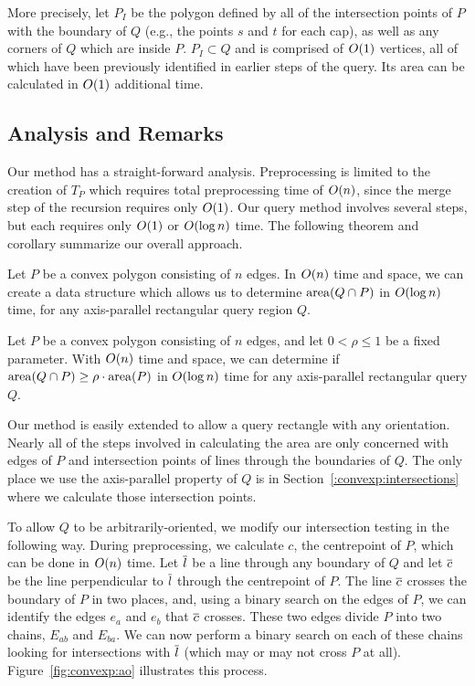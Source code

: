 More precisely, let $P_I$ be the polygon defined by all of the intersection  points of $P$ with the boundary of $Q$ (e.g., the points $s$ and $t$ for each cap), as well as any corners of $Q$ which are inside $P$. $P_I \subset Q$ and is comprised of $O\!\left(1\right)$ vertices, all of which have been previously identified in earlier steps of the query. Its area can be calculated in $O\!\left(1\right)$ additional time.


\subsection{Analysis and Remarks}
\label{:convexp:analysis}

Our method has a straight-forward analysis. 
Preprocessing is limited to the creation of $T_P$ which requires total preprocessing time of $O\!\left(n\right)$, since the merge step of the recursion requires only $O\!\left(1\right)$.
Our query method involves several steps, but each requires only $O\!\left(1\right)$ or $O\!\left(\log{n}\right)$ time. 
The following theorem and corollary summarize our overall approach.

\begin{theorem}
\label{th:convexp:area}
Let $P$ be a convex polygon consisting of $n$ edges. In $O\!\left(n\right)$ time and space, we can create a data structure which allows us to determine $\operatorname{area}\!\left(Q \cap P\right)$ in $O\!\left(\log{n}\right)$ time, for any axis-parallel rectangular query region $Q$.
\end{theorem}

\begin{corollary}
\label{cor:convexp:mp}
Let $P$ be a convex polygon consisting of $n$ edges, and let $0 < \rho \leq 1$ be a fixed parameter. With $O\!\left(n\right)$ time and space, we can determine if $\operatorname{area}\!\left(Q \cap P\right) \geq \rho \cdot \operatorname{area}\!\left(P\right)$ in $O\!\left(\log{n}\right)$ time for any axis-parallel rectangular query $Q$.
\end{corollary}

Our method is easily extended to allow a query rectangle with any orientation.
Nearly all of the steps involved in calculating the area are only concerned with edges of $P$ and intersection points of lines through the boundaries of $Q$.
The only place we use the axis-parallel property of $Q$ is in Section~\ref{:convexp:intersections} where we calculate those intersection points.

To allow $Q$ to be arbitrarily-oriented, we modify our intersection testing in the following way. 
During preprocessing, we calculate $c$, the centrepoint of $P$, which can be done in $O\!\left(n\right)$ time.
Let $\overline{l}$ be a line through any boundary of $Q$ and let $\overline{c}$ be the line perpendicular to $\overline{l}$ through the centrepoint of $P$.
The line $\overline{c}$ crosses the boundary of $P$ in two places, and, using a binary search on the edges of $P$, we can identify the edges $e_a$ and $e_b$ that $\overline{c}$ crosses.
These two edges divide $P$ into two chains, $E_{ab}$ and $E_{ba}$.
We can now perform a binary search on each of these chains looking for intersections with $\overline{l}$ (which may or may not cross $P$ at all).
Figure~\ref{fig:convexp:ao} illustrates this process.

